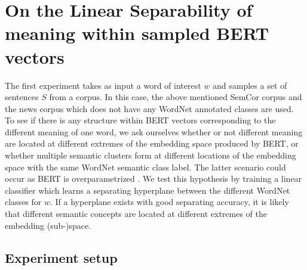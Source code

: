 \documentclass[a4paper,12pt,oneside,openright]{report}
\begin{document}
\section{On the Linear Separability of meaning within sampled BERT vectors}\label{sec:linear_separability_experiment}

The first experiment takes as input a word of interest $w$ and samples a set of sentences $S$ from a corpus.
In this case, the above mentioned SemCor corpus and the news corpus \cite{news_corpus} which does not have any WordNet annotated classes are used.
To see if there is any structure within BERT vectors corresponding to the different meaning of one word, we ask ourselves whether or not different meaning are located at different extremes of the embedding space produced by BERT, or whether multiple semantic clusters form at different locations of the embedding space with the same WordNet semantic class label.
The latter scenario could occur as BERT is overparametrized \cite{kovaleva19}.
We test this hypothesis by training a linear classifier which learns a separating hyperplane between the different WordNet classes for $w$.
If a hyperplane exists with good separating accuracy, it is likely that different semantic concepts are located at different extremes of the embedding (sub-)space.

\subsection{Experiment setup}
\end{document}
